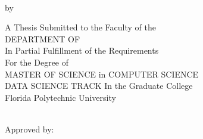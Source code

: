 %
%
%

\pagestyle{empty}
\begin{center}
	{{\bfseries\large{\MakeUppercase{\thesisTitle} \\}}\par}
	\vspace*{5mm}
	{by\\\vspace*{2mm}\textsc{\thesisBy}\par}
	\vspace*{5mm}
	A Thesis Submitted to the Faculty of the \\
	DEPARTMENT OF {\MakeUppercase{\thesisDegreeDepartment}}\\
	In Partial Fulfillment of the Requirements\\
	For the Degree of\\
	MASTER OF SCIENCE in COMPUTER SCIENCE\\ 
	DATA SCIENCE TRACK
	In the Graduate College\\\vspace*{1.5mm}
	Florida Polytechnic University\\\vspace*{5mm}
	\small  \thesisDate \\\vspace*{1.5mm}
	\vfill
	\begin{flushleft}
		Approved by:\\
\end{flushleft}
\end{center}
